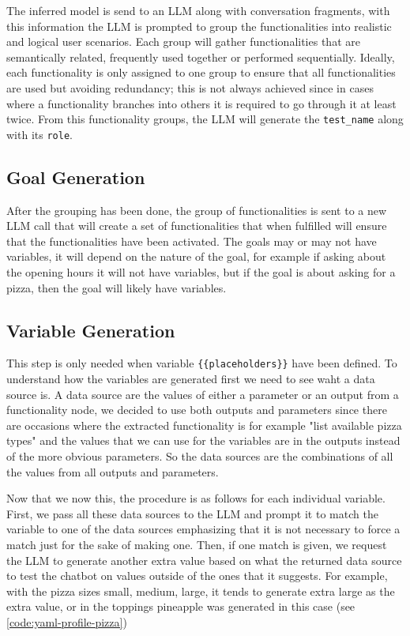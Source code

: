 The inferred model is send to an \ac{LLM} along with conversation fragments,
with this information the \ac{LLM} is prompted to
group the functionalities into realistic and logical user scenarios.
Each group will gather functionalities that are semantically related,
frequently used together or performed sequentially.
Ideally, each functionality is only assigned to one group
to ensure that all functionalities are used but avoiding redundancy;
this is not always achieved since in cases where a functionality branches into others
it is required to go through it at least twice.
From this functionality groups, the \ac{LLM} will generate
the \texttt{test\_name} along with its \texttt{role}.

\subsection{Goal Generation}

After the grouping has been done,
the group of functionalities is sent to a new \ac{LLM} call
that will create a set of functionalities that when fulfilled
will ensure that the functionalities have been activated.
The goals may or may not have variables,
it will depend on the nature of the goal,
for example if asking about the opening hours it will not have variables,
but if the goal is about asking for a pizza,
then the goal will likely have variables.

\subsection{Variable Generation}

This step is only needed when variable \texttt{\{\{placeholders\}\}} have been defined.
To understand how the variables are generated first we need to see waht a data source is.
A data source are the values of either a parameter or an output from a functionality node,
we decided to use both outputs and parameters since there are occasions
where the extracted functionality is for example "list available pizza types"
and the values that we can use for the variables
are in the outputs instead of the more obvious parameters.
So the data sources are the combinations of all the values
from all outputs and parameters.

Now that we now this, the procedure is as follows for each individual variable.
First, we pass all these data sources to the \ac{LLM}
and prompt it to match the variable to one of the data sources
emphasizing that it is not necessary to force a match
just for the sake of making one.
Then, if one match is given,
we request the \ac{LLM} to generate another extra value
based on what the returned data source
to test the chatbot on values outside of the ones that it suggests.
For example, with the pizza sizes small, medium, large,
it tends to generate extra large as the extra value,
or in the toppings pineapple was generated in this case (see \autoref{code:yaml-profile-pizza})

